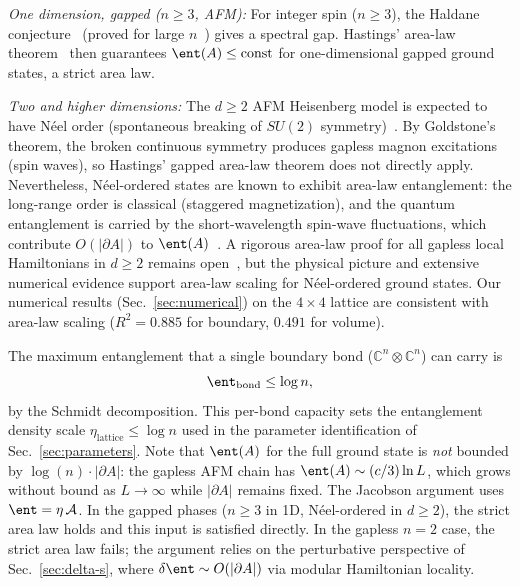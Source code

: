 \emph{One dimension, gapped ($n \geq 3$, AFM):}  For integer spin
($n \geq 3$), the Haldane conjecture~\cite{Haldane1983} (proved for
large $n$~\cite{AffleckKennedyLiebTasaki1987}) gives a spectral gap.
Hastings' area-law theorem~\cite{Hastings2007} then guarantees
$\ent(A) \leq \mathrm{const}$ for one-dimensional gapped ground
states, a strict area law.

\emph{Two and higher dimensions:}  The $d \geq 2$ AFM Heisenberg model
is expected to have N\'eel order (spontaneous breaking of $SU(2)$
symmetry)~\cite{EisertCramerPlenio2010}.  By Goldstone's theorem, the
broken continuous symmetry produces gapless magnon excitations (spin
waves), so Hastings' gapped area-law theorem does not directly apply.
Nevertheless, N\'eel-ordered states are known to exhibit area-law
entanglement: the long-range order is classical (staggered
magnetization), and the quantum entanglement is carried by the
short-wavelength spin-wave fluctuations, which contribute
$O(|\partial A|)$ to
$\ent(A)$~\cite{EisertCramerPlenio2010}.  A rigorous area-law proof
for all gapless local Hamiltonians in $d \geq 2$ remains
open~\cite{EisertCramerPlenio2010}, but the physical picture and
extensive numerical evidence support area-law scaling for
N\'eel-ordered ground states.  Our numerical results
(Sec.~\ref{sec:numerical}) on the $4 \times 4$ lattice are consistent
with area-law scaling ($R^2 = 0.885$ for boundary, $0.491$ for volume).

The maximum entanglement that a single boundary bond ($\mathbb{C}^n
\otimes \mathbb{C}^n$) can carry is
\begin{equation}
  \ent_{\mathrm{bond}} \leq \log n,
  \label{eq:channel-bound}
\end{equation}
by the Schmidt decomposition.  This per-bond capacity sets the
entanglement density scale $\eta_{\mathrm{lattice}} \leq \log n$
used in the parameter identification of
Sec.~\ref{sec:parameters}.  Note that $\ent(A)$ for the full
ground state is \emph{not} bounded by $\log(n) \cdot |\partial A|$:
the gapless AFM chain has $\ent(A) \sim (c/3)\ln L$, which grows
without bound as $L \to \infty$ while $|\partial A|$ remains fixed.
The Jacobson argument uses $\ent = \eta\,\mathcal{A}$.  In the gapped
phases ($n \geq 3$ in 1D, N\'eel-ordered in $d \geq 2$), the strict
area law holds and this input is satisfied directly.  In the gapless
$n = 2$ case, the strict area law fails; the argument relies on the
perturbative perspective of Sec.~\ref{sec:delta-s}, where
$\delta\ent \sim O(|\partial A|)$ via modular Hamiltonian locality.

